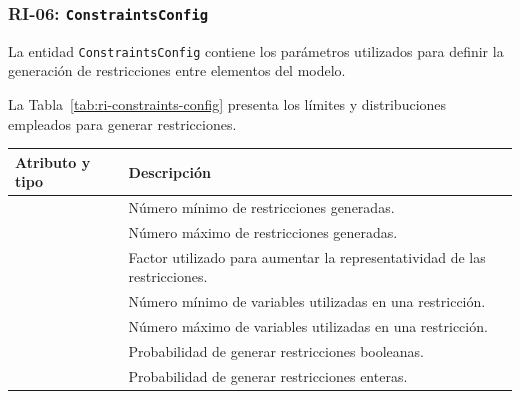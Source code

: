 \subsubsection*{RI-06: \texttt{ConstraintsConfig}}

La entidad \texttt{ConstraintsConfig} contiene los parámetros utilizados para definir la generación de restricciones entre elementos del modelo.

La Tabla~\ref{tab:ri-constraints-config} presenta los límites y distribuciones empleados para generar restricciones.

\begin{longtable}{@{}P{5.3cm} P{\dimexpr\textwidth-5.3cm-2\tabcolsep\relax}@{}}
\toprule
\textbf{Atributo y tipo} & \textbf{Descripción} \\
\midrule
\endhead

 & Número mínimo de restricciones generadas. \\

\midrule
{} & Número máximo de restricciones generadas. \\

\midrule
{} & Factor utilizado para aumentar la representatividad de las restricciones. \\

\midrule
{} & Número mínimo de variables utilizadas en una restricción. \\

\midrule
{} & Número máximo de variables utilizadas en una restricción. \\

\midrule
{} & Probabilidad de generar restricciones booleanas. \\

\midrule
{} & Probabilidad de generar restricciones enteras. \\


\end{longtable}
